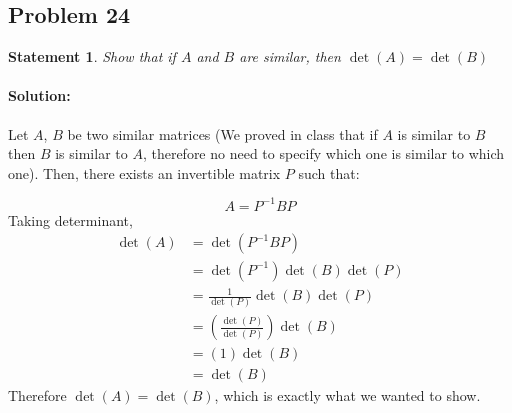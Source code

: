\documentclass[12pt, letterpaper]{article}
\theoremstyle{statement}
\theoremstyle{statement}
\newtheorem*{atmStat}{Statement}
\newenvironment{Solution}{\noindent\ignorespaces\paragraph{Solution:}}{\hfill \ding{122}\par\noindent}
\begin{document}
    \subsection*{Problem 24}
    \begin{atmStat}
    Show that if $A$ and $B$ are similar, then $\det(A)=\det(B)$
    \end{atmStat}
    \begin{Solution}
    Let $A$, $B$ be two similar matrices (We proved in class that if $A$ is similar to $B$ then $B$ is similar to $A$, therefore no need to specify which one is similar to which one). Then, there exists an invertible matrix $P$ such that: 
    
    $$
    A=P^{-1}BP
    $$
    Taking determinant,
    \begin{align*}
        \det(A) &= \det(P^{-1}BP) \\
        &= \det(P^{-1})\det(B)\det(P) \\
        &= \frac{1}{\det(P)}\det(B)\det(P) \\
        &= \left(\frac{\det(P)}{\det(P)}\right)\det(B) \\
        &= (1) \det(B) \\
        &= \det(B)
    \end{align*}
    Therefore $\det(A)=\det(B)$, which is exactly what we wanted to show.
    \end{Solution}
    
\end{document}
